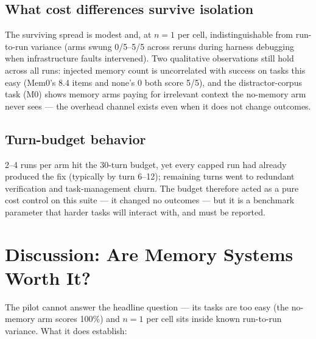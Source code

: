 \documentclass[11pt]{article}
\begin{document}
\subsection{What cost differences survive isolation}
The surviving spread is modest and, at $n{=}1$ per cell, indistinguishable from run-to-run variance (arms swung 0/5--5/5 across reruns during harness debugging when infrastructure faults intervened). Two qualitative observations still hold across all runs: injected memory count is uncorrelated with success on tasks this easy (Mem0's 8.4 items and none's 0 both score 5/5), and the distractor-corpus task (M0) shows memory arms paying for irrelevant context the no-memory arm never sees --- the overhead channel exists even when it does not change outcomes.

\subsection{Turn-budget behavior}
2--4 runs per arm hit the 30-turn budget, yet every capped run had already produced the fix (typically by turn 6--12); remaining turns went to redundant verification and task-management churn. The budget therefore acted as a pure cost control on this suite --- it changed no outcomes --- but it is a benchmark parameter that harder tasks will interact with, and must be reported.

\section{Discussion: Are Memory Systems Worth It?}

The pilot cannot answer the headline question --- its tasks are too easy (the no-memory arm scores 100\%) and $n{=}1$ per cell sits inside known run-to-run variance. What it does establish:
\end{document}
